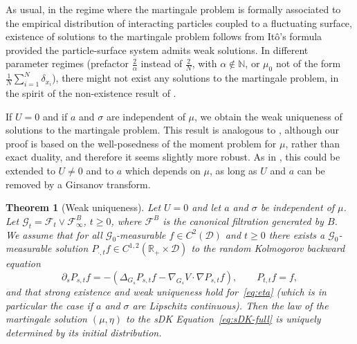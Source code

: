 \documentclass[11pt, a4paper]{article}
\newcommand{\cdummy}{\cdot}
\newtheorem{theorem}{Theorem}
\begin{document}
As usual, in the regime where the martingale problem is formally associated to the empirical distribution of interacting particles coupled to a fluctuating surface,  existence of solutions to the martingale problem follows from It\^o's formula provided the particle-surface system admits weak solutions. In different parameter regimes (prefactor $\frac2\alpha$ instead of $\frac2N$, with $\alpha \not\in \mathbb N$, or $\mu_0$ not of the form $\frac1N \sum_{i=1}^N \delta_{x_i}$), there might not exist any solutions to the martingale problem, in the spirit of the non-existence result of \cite{Konarovskyi}.

If $U = 0$ and if $a$ and $\sigma$ are independent of $\mu$, we
obtain the weak uniqueness of solutions to the martingale problem. This result is analogous to \cite{Konarovskyi}, although our proof is based on the well-posedness of the moment problem for $\mu$, rather than exact duality, and therefore it seems slightly more robust. As in \cite{konarovskyi2020dean}, this could be extended to $U\neq 0$ and to $a$ which depends on $\mu$, as long as $U$ and $a$ can be removed by a Girsanov transform.


\begin{theorem}[Weak uniqueness]
Let $U = 0$ and let $a$ and $\sigma$ be independent of $\mu$. Let
$\mathcal{G}_t =\mathcal{F}_t \vee \mathcal{F}^B_{\infty}$, $t\ge 0$, where
$\mathcal{F}^B$ is the canonical filtration generated by $B$. We assume that
for all $\mathcal{G}_0$-measurable $f \in C^2 (\mathcal{D})$ and $t \geq 0$ there
exists a $\mathcal{G}_0$-measurable solution $P_{\cdummy, t} f \in C^{1, 2}
(\mathbb{R}_+ \times \mathcal{D})$ to the random Kolmogorov backward equation
\[ \partial_s P_{s, t} f = - (\Delta_{G_s} P_{s, t} f - \nabla_{G_s} V \cdummy
   \nabla P_{s, t} f), \qquad P_{t, t} f = f, \]
and that strong existence and weak uniqueness hold for~\eqref{eq:eta} (which is in particular the case if $a$ and $\sigma$ are Lipschitz continuous). Then the law of the martingale solution $(\mu, \eta)$ to
the sDK Equation~\eqref{eq:sDK-full} is uniquely determined by its initial distribution.
\end{theorem}
\end{document}
